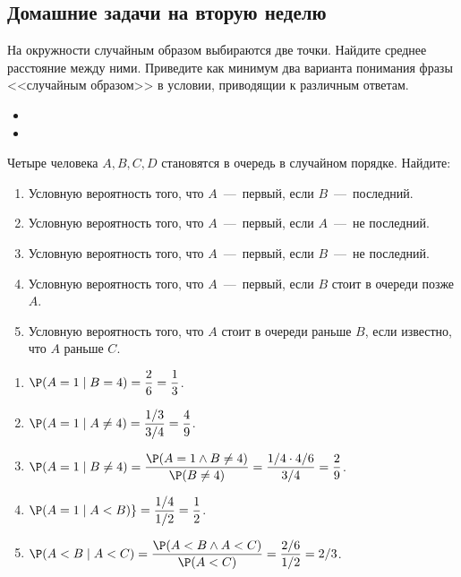 \subsection{Домашние задачи на вторую неделю}
\begin{problem}
    На окружности случайным образом выбираются две точки.
    Найдите среднее расстояние между ними.
    Приведите как минимум два варианта понимания фразы <<случайным образом>> в условии, приводящии к различным ответам.
\end{problem}
\begin{solution}
    \begin{itemize}
        \item
        \item
    \end{itemize}
\end{solution}
\begin{problem}
    Четыре человека $A, B, C, D$ становятся в очередь в случайном порядке.
    Найдите:
    \begin{enumerate}
        \item Условную вероятность того, что $A$~---~первый, если $B$~---~последний.
        \item Условную вероятность того, что $A$~---~первый, если $A$~---~не последний.
        \item Условную вероятность того, что $A$~---~первый, если $B$~---~не последний.
        \item Условную вероятность того, что $A$~---~первый, если $B$ стоит в очереди позже $A$.
        \item Условную вероятность того, что $A$ стоит в очереди раньше $B$, если известно, что $A$ раньше $C$.
    \end{enumerate}
\end{problem}
\begin{solution} \leavevmode
    \begin{enumerate}
        \item $\P(A = 1\mid B = 4) = \dfrac{2}{6} = \dfrac{1}{3}$.
        \item $\P(A = 1\mid A \neq 4) = \dfrac{1/3}{3/4} = \dfrac{4}{9}$.
        \item $\P(A = 1\mid B \neq 4) = \dfrac{\P(A = 1 \wedge B \neq 4)}{\P(B \neq 4)} = \dfrac{1/4 \cdot 4/6}{3/4} = \dfrac{2}{9}$.
        \item $\P(A = 1\mid A < B)\} = \dfrac{1/4}{1/2} = \dfrac{1}{2}$.
        \item $\P(A < B \mid A < C) = \dfrac{\P(A < B \wedge A < C)}{\P(A < C)} = \dfrac{2/6}{1/2} = 2/3$.
    \end{enumerate}
\end{solution}
